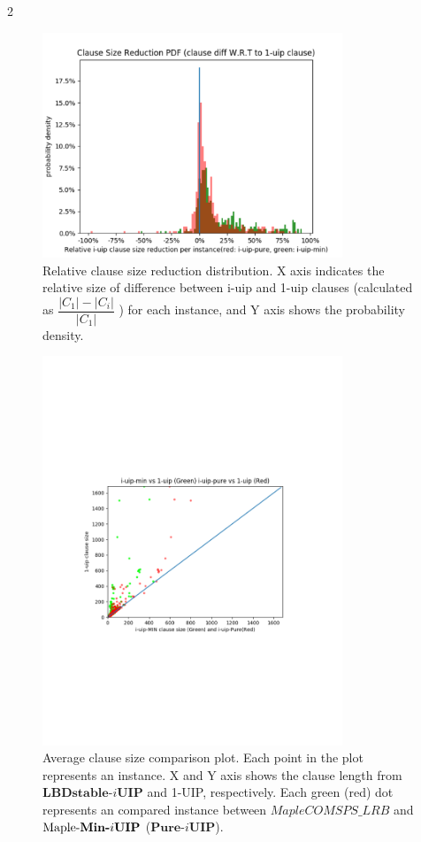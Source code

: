 \documentclass[runningheads]{llncs}
\newcommand{\oneUIPClause}{\ensuremath{C_{1}}}
\newcommand{\iUIPClause}{\ensuremath{C_{i}}}
\newcommand{\IUIP}{\textbf{LBDstable-$i$UIP}}
\newcommand{\IUIPPURE}{\textbf{Pure-$i$UIP}}
\newcommand{\IUIPMIN}{\textbf{Min-$i$UIP}}
\newcommand{\MapleBase}{\textit{MapleCOMSPS\_LRB}}
\newcommand{\MapleIUIMIN}{\text{Maple-\IUIPMIN}}
\begin{document}
2\begin{figure}
    \centering
    \includegraphics[width=0.8\textwidth]{figures/clause_reduction_PDF}
    \caption{ Relative clause size reduction distribution. X axis
      indicates the relative size of difference between i-uip and
      1-uip clauses (calculated as
      $\dfrac{|\oneUIPClause|-|\iUIPClause|}{|\oneUIPClause|}$ ) for
      each instance, and Y axis shows the probability density.}
     \label{fig:len_pdf}
\end{figure}
\begin{figure} \label{fig:len_compare}
    \centering
    \includegraphics[width=0.8\textwidth]{figures/i-uip-sizes-compare.pdf}
    \caption{Average clause size comparison plot. Each point in the
      plot represents an instance. X and Y axis shows the clause
      length from $\IUIP$ and 1-UIP, respectively. Each green (red)
      dot represents an compared instance between $\MapleBase$ and
      $\MapleIUIMIN$ ($\IUIPPURE$). }
    \label{fig:len_compare}
\end{figure}
\end{document}
